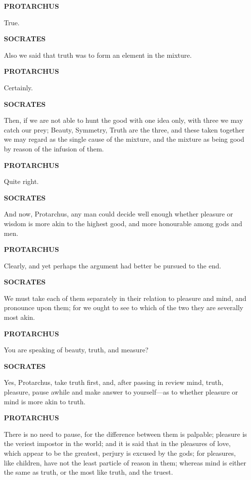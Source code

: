 \documentclass[11pt,letter]{article}
\begin{document}
\par \textbf{PROTARCHUS}
\par   True.

\par \textbf{SOCRATES}
\par   Also we said that truth was to form an element in the mixture.

\par \textbf{PROTARCHUS}
\par   Certainly.

\par \textbf{SOCRATES}
\par   Then, if we are not able to hunt the good with one idea only, with three we may catch our prey; Beauty, Symmetry, Truth are the three, and these taken together we may regard as the single cause of the mixture, and the mixture as being good by reason of the infusion of them.

\par \textbf{PROTARCHUS}
\par   Quite right.

\par \textbf{SOCRATES}
\par   And now, Protarchus, any man could decide well enough whether pleasure or wisdom is more akin to the highest good, and more honourable among gods and men.

\par \textbf{PROTARCHUS}
\par   Clearly, and yet perhaps the argument had better be pursued to the end.

\par \textbf{SOCRATES}
\par   We must take each of them separately in their relation to pleasure and mind, and pronounce upon them; for we ought to see to which of the two they are severally most akin.

\par \textbf{PROTARCHUS}
\par   You are speaking of beauty, truth, and measure?

\par \textbf{SOCRATES}
\par   Yes, Protarchus, take truth first, and, after passing in review mind, truth, pleasure, pause awhile and make answer to yourself—as to whether pleasure or mind is more akin to truth.

\par \textbf{PROTARCHUS}
\par   There is no need to pause, for the difference between them is palpable; pleasure is the veriest impostor in the world; and it is said that in the pleasures of love, which appear to be the greatest, perjury is excused by the gods; for pleasures, like children, have not the least particle of reason in them; whereas mind is either the same as truth, or the most like truth, and the truest.
\end{document}
